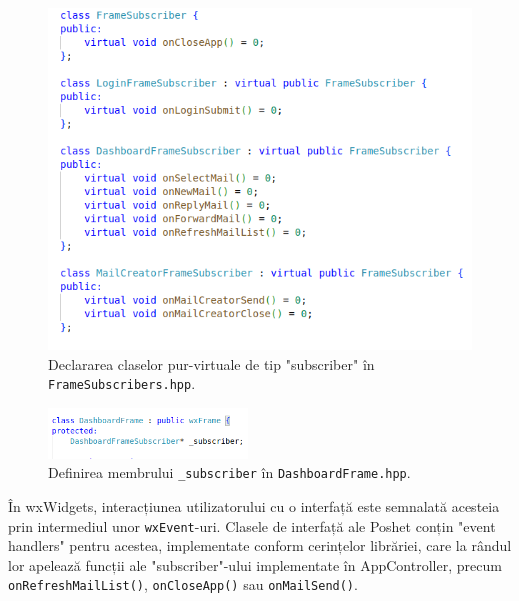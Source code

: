 \documentclass[runningheads]{llncs}
\begin{document}
\begin{figure}
    \centering
    \includegraphics[width=\textwidth]{subscribers.png}
    \caption{Declararea claselor pur-virtuale de tip "subscriber" în \texttt{FrameSubscribers.hpp}.}
    \label{fig:subscribers}
\end{figure}


\begin{figure}
    \centering
    \includegraphics[width={200px}]{subscriberMember.png}
    \caption{Definirea membrului \texttt{\_subscriber} în \texttt{DashboardFrame.hpp}.}
    \label{fig:subscriberMember}
\end{figure}

\newpage

În wxWidgets, interacțiunea utilizatorului cu o interfață este semnalată acesteia prin intermediul unor \texttt{wxEvent}-uri. Clasele de interfață ale Poshet conțin "event handlers" pentru acestea, implementate conform cerințelor librăriei, care la rândul lor apelează funcții ale "subscriber"-ului implementate în AppController, precum \texttt{onRefreshMailList()}, \texttt{onCloseApp()} sau \texttt{onMailSend()}.
\end{document}
